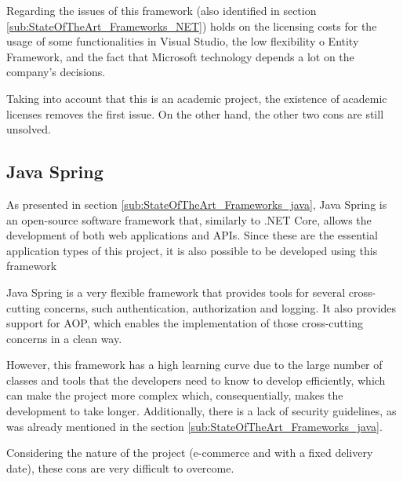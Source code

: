 Regarding the issues of this framework (also identified in section \ref{sub:StateOfTheArt_Frameworks_NET}) holds on the licensing costs for the usage of some functionalities in Visual Studio, the low flexibility o Entity Framework, and the fact that Microsoft technology depends a lot on the company's decisions. 
\par 
Taking into account that this is an academic project, the existence of academic licenses removes the first issue. On the other hand, the other two cons are still unsolved.

\subsection{Java Spring}
As presented in section \ref{sub:StateOfTheArt_Frameworks_java}, Java Spring is an open-source software framework that, similarly to .NET Core, allows the development of both web applications and \gls{API}s. Since these are the essential application types of this project, it is also possible to be developed using this framework
\par
Java Spring is a very flexible framework that provides tools for several cross-cutting concerns, such authentication, authorization and logging. It also provides support for \gls{AOP}, which enables the implementation of those cross-cutting concerns in a clean way.
\par
However, this framework has a high learning curve due to the large number of classes and tools that the developers need to know to develop efficiently, which can make the project more complex which, consequentially, makes the development to take longer. Additionally, there is a lack of security guidelines, as was already mentioned in the section \ref{sub:StateOfTheArt_Frameworks_java}. 

\par

Considering the nature of the project (e-commerce and with a fixed delivery date), these cons are very difficult to overcome.



